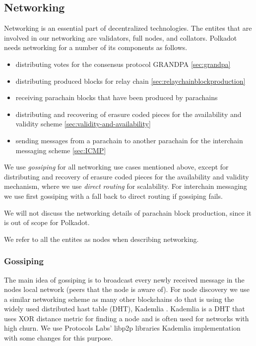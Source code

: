 \subsection{Networking}\label{sec:networking}
Networking is an essential part of decentralized technologies.
The entites that are involved in our networking are validators, full nodes, and collators.
Polkadot needs networking for a number of its components as follows.
\begin{itemize}
\item distributing votes for the consensus protocol GRANDPA \ref{sec:grandpa}
\item distributing produced blocks for relay chain \ref{sec:relaychainblockproduction}
\item receiving parachain blocks that have been produced by parachains
\item distributing and recovering of erasure coded pieces for the availability and validity scheme \ref{sec:validity-and-availability}
\item sending messages from a parachain to another parachain for the interchain messaging scheme \ref{sec:ICMP}
\end{itemize}

We use \emph{gossiping} for all networking use cases mentioned above, except for distributing and recovery of erasure coded pieces for the availability and validity mechanism, where we use \emph{direct routing} for scalability.
For interchain messaging we use first gossiping with a fall back to direct routing if gossiping fails.

We will not discuss the networking details of parachain block production, since it is out of scope for Polkadot.

We refer to all the entites as nodes when describing networking.


\subsubsection{Gossiping}
The main idea of gossiping is to broadcast every newly received message in the nodes local network (peers that the node is aware of).
For node discovery we use a similar networking scheme as many other blockchains do that is using the widely used distributed hast table (DHT), Kademlia \cite{Maymounkov:2002:Kademila}.
Kademlia is a DHT that uses XOR distance metric for finding a node and is often used for networks with high churn.
We use Protocols Labs' libp2p libraries \cite{} Kademlia implementation with some changes for this purpose.

